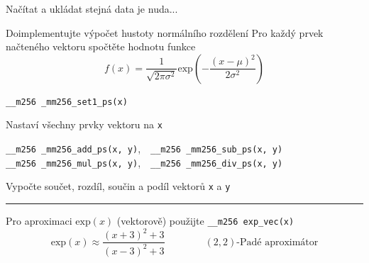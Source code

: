 \documentclass[usenames,dvipsnames,9pt]{beamer}
\begin{document}
\begin{frame}[fragile]
  Načítat a ukládat stejná data je nuda...
  \begin{block}{Doimplementujte výpočet hustoty normálního rozdělení}
    Pro každý prvek načteného vektoru spočtěte hodnotu funkce
    \[ f(x)=\frac{1}{\sqrt{2\pi\sigma^2}} \mathrm{exp}\left( -\frac{(x-\mu)^2}{2\sigma^2} \right) \]
  \end{block}

  \texttt{__m256 _mm256_set1_ps(x)}

  \vspace{-0.35em}\hspace{10pt} Nastaví všechny prvky vektoru na \texttt{x}

  \texttt{__m256 _mm256_add_ps(x, y)},\ \ \texttt{__m256 _mm256_sub_ps(x, y)} \\
  \texttt{__m256 _mm256_mul_ps(x, y)},\ \ \texttt{__m256 _mm256_div_ps(x, y)}

  \vspace{-0.35em}\hspace{10pt} Vypočte součet, rozdíl, součin a podíl vektorů \texttt{x} a \texttt{y}

  \vspace{1em}\hrule\vspace{1em}
  Pro aproximaci $\mathrm{exp}(x)$ (vektorově) použijte \texttt{__m256 exp_vec(x)}
  \[ \mathrm{exp}(x) \approx \frac{(x+3)^2 + 3}{(x-3)^2 + 3} \qquad\qquad (2,2)\text{-Padé aproximátor} \]
\end{frame}
\end{document}
